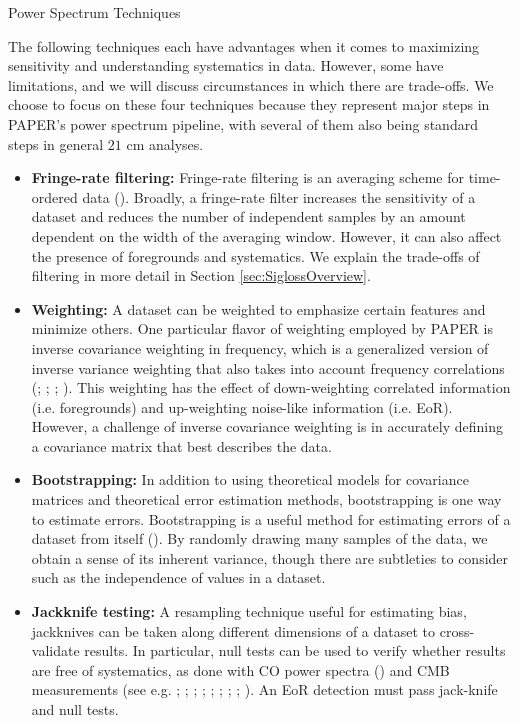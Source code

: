 \documentclass[preprint2,numberedappendix,tighten]{aastex6}  %
\begin{document}
\begin{center}
Power Spectrum Techniques
\end{center}

The following techniques each have advantages when it comes to maximizing sensitivity and understanding systematics in 
data. However, some have limitations, and we will discuss circumstances in which there are trade-offs. We choose to focus on 
these four techniques because they represent major steps in PAPER's power spectrum pipeline, with several of them also 
being standard steps in general $21$ cm analyses.
\begin{itemize}
\item \textbf{Fringe-rate filtering:} Fringe-rate filtering is an averaging scheme for time-ordered data 
(\citealt{parsons_et_al2016}). Broadly, a fringe-rate filter increases the sensitivity of a dataset and reduces the number of 
independent samples by an amount dependent on the width of the averaging window. However, it can also affect the presence 
of foregrounds and systematics. We explain the trade-offs of filtering in more detail in Section \ref{sec:SiglossOverview}.
\item \textbf{Weighting:} A dataset can be weighted to emphasize certain features and minimize others. One particular flavor of 
weighting employed by PAPER is inverse covariance weighting in frequency, which is a generalized version of inverse variance 
weighting that also takes into account frequency correlations (\citealt{liu_tegmark2011}; \citealt{dillon_et_al2013a}; \citealt{liu_et_al2014a}; \citealt{liu_et_al2014b}). This weighting has the effect of down-weighting correlated 
information (i.e. foregrounds) and up-weighting noise-like information (i.e. EoR). However, a challenge of inverse covariance 
weighting is in accurately defining a covariance matrix that best describes the data. 
\item \textbf{Bootstrapping:} In addition to using theoretical models for covariance matrices and theoretical error estimation 
methods, bootstrapping is one way to estimate errors. Bootstrapping is a useful method for estimating errors of a dataset from 
itself (\citealt{andrae2010}). By randomly drawing many samples of the data, we obtain a sense of its inherent variance, though there are subtleties to 
consider such as the independence of values in a dataset.
\item \textbf{Jackknife testing:} A resampling technique useful for estimating bias, jackknives can be taken along different 
dimensions of a dataset to cross-validate results. In particular, null tests can be used to verify whether results are free of 
systematics, as done with CO power spectra (\citealt{keating_et_al2016}) and CMB measurements (see e.g. \citealt{ade_et_al2008}; \citealt{chiang_et_al2010}; \citealt{bischoff_et_al2011}; \citealt{das_et_al2011}; \citealt{araujo_et_al2012}; \citealt{crites_et_al2015}; \citealt{ade_et_al2016}; \citealt{ade_et_al2017}; \citealt{sherwin_et_al2017}). An EoR detection must pass jack-knife and null tests.
\end{itemize}
\end{document}
